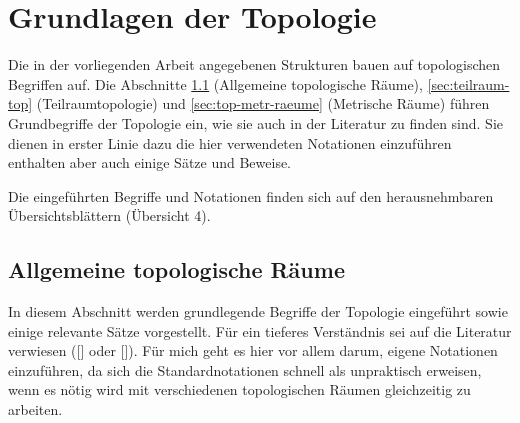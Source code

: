 \chapter{Grundlagen der Topologie}\label{chap:topologie-grundlagen}

Die in der vorliegenden Arbeit angegebenen Strukturen bauen auf topologischen Begriffen auf.
Die Abschnitte \ref{sec:allg-top-raeume} (Allgemeine topologische Räume), \ref{sec:teilraum-top} (Teilraumtopologie) und \ref{sec:top-metr-raeume} (Metrische Räume) führen Grundbegriffe der Topologie ein, wie sie auch in der Literatur zu finden sind. Sie dienen in erster Linie dazu die hier verwendeten Notationen einzuführen enthalten aber auch einige Sätze und Beweise.

Die eingeführten Begriffe und Notationen finden sich auf den herausnehmbaren Übersichtsblättern (Übersicht 4).



\section{Allgemeine topologische Räume}\label{sec:allg-top-raeume} 
    In diesem Abschnitt werden grundlegende Begriffe der Topologie eingeführt sowie einige relevante Sätze vorgestellt. 
    Für ein tieferes Verständnis sei auf die Literatur verwiesen ([\cite{jaenich-k-2013--a}] oder [\cite{manetti-m-2015--a}]). 
    Für mich geht es hier vor allem darum, eigene Notationen einzuführen, da sich die Standardnotationen schnell als unpraktisch erweisen, wenn es nötig wird mit verschiedenen topologischen Räumen gleichzeitig zu arbeiten.
    
